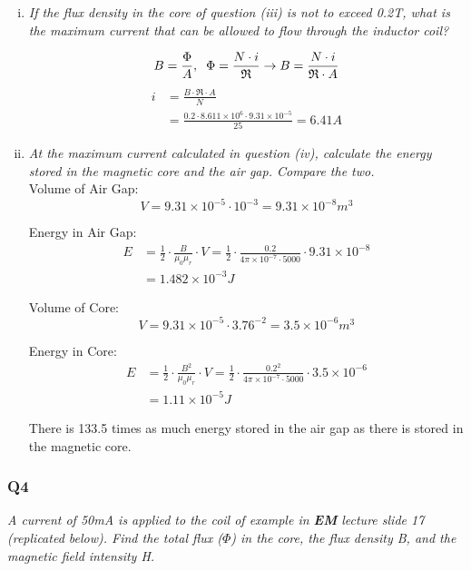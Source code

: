 \documentclass[a4paper,11pt]{article}
\begin{document}
\begin{enumerate}[i.]
    \item \textit{If the flux density in the core of question (iii) is not to exceed 0.2T, what is the maximum current that can be allowed to flow through the inductor coil?}
    
    $$ B = \frac{\Phi}{A}, \hspace{2mm} \Phi = \frac{N \cdot i}{\mathfrak{R}} \rightarrow B = \frac{N \cdot i}{\mathfrak{R} \cdot A} $$
    \begin{align*}
        i&= \frac{B \cdot \mathfrak{R} \cdot A}{N}\\
        &= \frac{0.2\cdot 8.611\times10^6\cdot 9.31\times 10^{-5}}{25} = 6.41A
    \end{align*}


    \item \textit{At the maximum current calculated in question (iv), calculate the energy stored in the magnetic core and the air gap. Compare the two.}\\
    

    Volume of Air Gap:
    $$V = 9.31\times10^{-5}\cdot 10^{-3} = 9.31\times10^{-8}m^3$$

    Energy in Air Gap:
    \begin{align*}
        E &= \frac{1}{2}\cdot \frac{B}{\mu_0 \mu_r}\cdot V = \frac{1}{2} \cdot\frac{0.2}{4\pi\times10^{-7}\cdot 5000}\cdot 9.31\times10^{-8}\\
        &= 1.482\times 10^{-3}J
    \end{align*}


    Volume of Core:
    $$V = 9.31\times10^{-5}\cdot 3.76^{-2} = 3.5\times10^{-6}m^3$$

    Energy in Core:
    \begin{align*}
        E &= \frac{1}{2}\cdot \frac{B^2}{\mu_0 \mu_r}\cdot V = \frac{1}{2}\cdot\frac{0.2^2}{4\pi\times10^{-7}\cdot 5000}\cdot 3.5\times10^{-6}\\
        &= 1.11\times 10^{-5}J
    \end{align*}

    There is 133.5 times as much energy stored in the air gap as there is stored in the magnetic core. \\

\end{enumerate}


\subsubsection*{Q4}
\textit{A current of 50mA is applied to the coil of example in \textbf{EM} lecture slide 17 (replicated below). Find the total flux ($\Phi$) in the core, the flux density B, and the magnetic field intensity H.}
\end{document}
